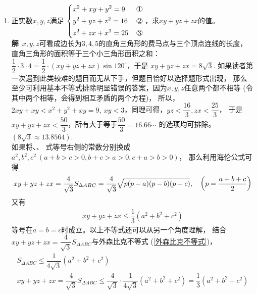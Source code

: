 \begin{enumerate}[label={【\textbf{例\thechapter.\arabic*}】},
 leftmargin=\inteval{\myenumleftmargin}pt,
 itemsep=\inteval{\myenumitempsep}pt,
 itemindent=\inteval{\myenumitemindent}pt]
% 
\item \label{三元二次非线性方程组-费马点}正实数$ x,y,z $满足
$ \begin{dcases}
    x^2+xy+y^2=9  &\mycircled{1} \\
    y^2+yz+z^2=16  &\mycircled{2} \\
    z^2+zx+x^2=25 &\mycircled{3}
\end{dcases} $，求$ xy+yz+zx $的值。\\
\textbf{解}\ $ x,y,z $可看成边长为$ 3,4,5 $的直角三角形的费马点与三个顶点连线的长度，
直角三角形的面积等于三个小三角形面积之和：$ \dfrac{1}{2}\cdot 3\cdot 4= \dfrac{1}{2}\cdot(xy+yz+zx)\sin 120^{\circ} $，于是
$ xy+yz+zx=8\sqrt{3} $. 如果读者第一次遇到此类较难的题目而无从下手，但题目恰好以选择题形式出现，
那么至少可利用基本不等式排除明显错误的答案，因为$ x,y,z $任意两个都不相等
(令其中两个相等，会得到相互矛盾的两个方程)，
所以，$ 2xy+xy < x^2+y^2+xy =9,\ xy <3$，同理可得，$ yz<\dfrac{16}{3},zx<\dfrac{25}{3} $，
于是$ xy+yz+zx < \dfrac{50}{3} $，所有大于等于$ \dfrac{50}{3}=16.66\cdots $
的选项均可排除。$ (8\sqrt{3}\approx 13.8564 ) $. \\
如果将、、
式等号右侧的常数分别换成$ a^2,b^2,c^2\ 
(a+b>c>0,b+c>a>0,c+a>b>0) $，
那么利用海伦公式可得
\begin{gather*}
    xy+yz+zx=
    \dfrac{4}{\sqrt{3}}S_{\Delta ABC}=
    \dfrac{4}{\sqrt{3}}\sqrt{p(p-a)(p-b)(p-c)}, \quad 
    \left(p=\dfrac{a+b+c}{2} \right)
\end{gather*}
又有
\begin{gather*}
    xy+yz+zx\leq \dfrac{1}{3}(a^2+b^2+c^2)
\end{gather*}
等号在$ a=b=c $时成立。以上不等式还可以从另一个角度理解，
结合$ xy+yz+zx=\dfrac{4}{\sqrt{3}}S_{\Delta ABC} $与外森比克不等式
(\ref{外森比克不等式})，
\begin{gather*}
    S_{\Delta ABC}\leq \dfrac{1}{4\sqrt{3}}(a^2+b^2+c^2) \\
    xy+yz+zx=\dfrac{4}{\sqrt{3}}S_{\Delta ABC}\leq 
    \dfrac{4}{\sqrt{3}}\cdot \dfrac{1}{4\sqrt{3}}(a^2+b^2+c^2)=
    \dfrac{1}{3}(a^2+b^2+c^2)
\end{gather*}


\end{enumerate}
